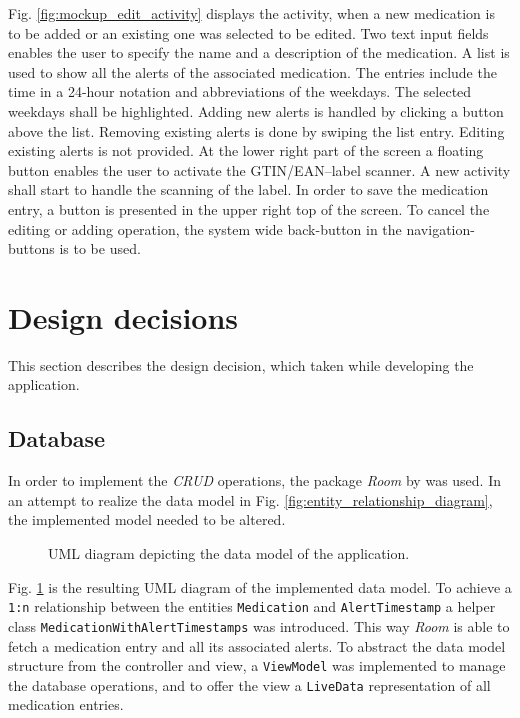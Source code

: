 \documentclass[conference]{IEEEtran}
\begin{document}
Fig. \ref{fig:mockup_edit_activity} displays the activity, when a new medication is to be added or an existing
one was selected to be edited. Two text input fields enables the user to specify the name and a description of 
the medication. A list is used to show all the alerts of the associated medication. The entries include the time
in a 24-hour notation and abbreviations of the weekdays. The selected weekdays shall be highlighted. Adding new 
alerts is handled by clicking a button above the list. Removing existing alerts is done by swiping the list entry.
Editing existing alerts is not provided. At the lower right part of the screen a floating button enables the user
to activate the GTIN/EAN--label scanner. A new activity shall start to handle the scanning of the label.
In order to save the medication entry, a button is presented in the upper right top of the screen. To cancel the
editing or adding operation, the system wide back-button in the navigation-buttons is to be used.

\section{Design decisions}
This section describes the design decision, which taken while developing the application.

\subsection{Database}
In order to implement the \textit{CRUD} operations, the package \textit{Room} by \cite{room} was used.
In an attempt to realize the data model in Fig. \ref{fig:entity_relationship_diagram}, the implemented model
needed to be altered.

\begin{figure}[H]
	\centerline{}
	\caption{UML diagram depicting the data model of the application.}
	\label{fig:uml_diagram}
\end{figure}

Fig. \ref{fig:uml_diagram} is the resulting UML diagram of the implemented data model. To achieve a \texttt{1:n}
relationship between the entities \texttt{Medication} and \texttt{AlertTimestamp} a helper class
\texttt{MedicationWithAlertTimestamps} was introduced. This way \textit{Room} is able to fetch a medication entry
and all its associated alerts. To abstract the data model structure from the controller and view, a
\texttt{ViewModel} was implemented to manage the database operations, and to offer the view a \texttt{LiveData}
representation of all medication entries.
\end{document}
